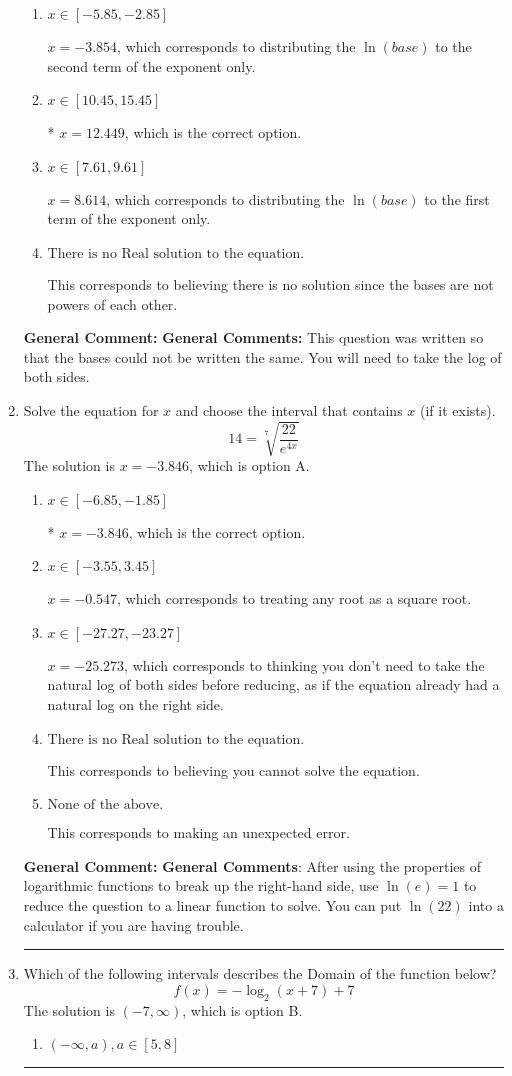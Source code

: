\documentclass{extbook}[14pt]
\newcommand{\litem}[1]{\item #1

\rule{\textwidth}{0.4pt}}
\begin{document}
\begin{enumerate}
{\begin{enumerate}[label=\Alph*.]
$x = -2.667$, which corresponds to solving the numerators as equal while ignoring the bases are different.
\item \( x \in [-5.85, -2.85] \)

$x = -3.854$, which corresponds to distributing the $\ln(base)$ to the second term of the exponent only.
\item \( x \in [10.45, 15.45] \)

* $x = 12.449$, which is the correct option.
\item \( x \in [7.61, 9.61] \)

$x = 8.614$, which corresponds to distributing the $\ln(base)$ to the first term of the exponent only.
\item \( \text{There is no Real solution to the equation.} \)

This corresponds to believing there is no solution since the bases are not powers of each other.
\end{enumerate}

\textbf{General Comment:} \textbf{General Comments:} This question was written so that the bases could not be written the same. You will need to take the log of both sides.
}
\litem{
 Solve the equation for $x$ and choose the interval that contains $x$ (if it exists).
\[  14 = \sqrt[7]{\frac{22}{e^{4x}}} \]The solution is \( x = -3.846 \), which is option A.\begin{enumerate}[label=\Alph*.]
\item \( x \in [-6.85, -1.85] \)

* $x = -3.846$, which is the correct option.
\item \( x \in [-3.55, 3.45] \)

$x = -0.547$, which corresponds to treating any root as a square root.
\item \( x \in [-27.27, -23.27] \)

$x = -25.273$, which corresponds to thinking you don't need to take the natural log of both sides before reducing, as if the equation already had a natural log on the right side.
\item \( \text{There is no Real solution to the equation.} \)

This corresponds to believing you cannot solve the equation.
\item \( \text{None of the above.} \)

This corresponds to making an unexpected error.
\end{enumerate}

\textbf{General Comment:} \textbf{General Comments}: After using the properties of logarithmic functions to break up the right-hand side, use $\ln(e) = 1$ to reduce the question to a linear function to solve. You can put $\ln(22)$ into a calculator if you are having trouble.
}
\litem{
Which of the following intervals describes the Domain of the function below?
\[ f(x) = -\log_2{(x+7)}+7 \]The solution is \( (-7, \infty) \), which is option B.\begin{enumerate}[label=\Alph*.]
\item \( (-\infty, a), a \in [5, 8] \)


\end{enumerate}}
\end{enumerate}
\end{document}
